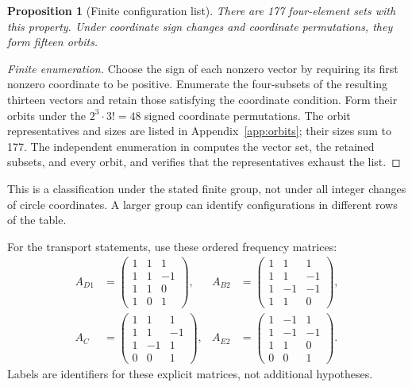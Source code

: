 \documentclass[11pt,letterpaper]{article}
\newtheorem{proposition}[theorem]{Proposition}
\theoremstyle{definition}\newtheorem{definition}[theorem]{Definition}
\theoremstyle{remark}\newtheorem{remark}[theorem]{Remark}
\begin{document}
\begin{proposition}[Finite configuration list]\label{prop:orbits}
There are 177 four-element sets with this property. Under coordinate sign changes and coordinate permutations, they form fifteen orbits.
\end{proposition}
\begin{proof}[Finite enumeration]
Choose the sign of each nonzero vector by requiring its first nonzero coordinate to be positive. Enumerate the four-subsets of the resulting thirteen vectors and retain those satisfying the coordinate condition. Form their orbits under the $2^3\cdot3!=48$ signed coordinate permutations. The orbit representatives and sizes are listed in Appendix~\ref{app:orbits}; their sizes sum to 177. The independent enumeration in  computes the vector set, the retained subsets, and every orbit, and verifies that the representatives exhaust the list.
\end{proof}
This is a classification under the stated finite group, not under all integer changes of circle coordinates. A larger group can identify configurations in different rows of the table.

For the transport statements, use these ordered frequency matrices:
\begin{equation}\label{eq:selectedmatrices}
\begin{aligned}
 A_{D1}&=\begin{pmatrix}1&1&1\\1&1&-1\\1&1&0\\1&0&1\end{pmatrix},&
 A_{B2}&=\begin{pmatrix}1&1&1\\1&1&-1\\1&-1&-1\\1&1&0\end{pmatrix},\\[2pt]
 A_C&=\begin{pmatrix}1&1&1\\1&1&-1\\1&-1&1\\0&0&1\end{pmatrix},&
 A_{E2}&=\begin{pmatrix}1&-1&1\\1&-1&-1\\1&1&0\\0&0&1\end{pmatrix}.
\end{aligned}
\end{equation}
Labels are identifiers for these explicit matrices, not additional hypotheses.
\end{document}
